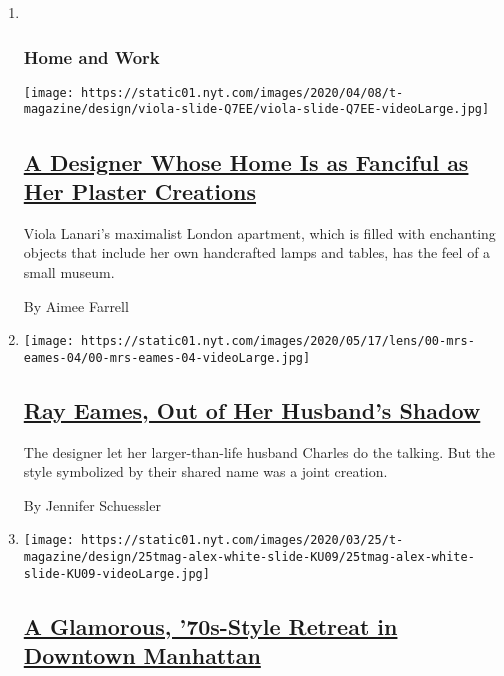 \begin{enumerate}
\def\labelenumi{\arabic{enumi}.}
\item ~
  \hypertarget{home-and-work}{%
  \subsubsection{Home and Work}\label{home-and-work}}

  \texttt{[image: https://static01.nyt.com/images/2020/04/08/t-magazine/design/viola-slide-Q7EE/viola-slide-Q7EE-videoLarge.jpg]}

  \hypertarget{a-designer-whose-home-is-as-fanciful-as-her-plaster-creations}{%
  \subsection{\texorpdfstring{\href{/2020/04/09/t-magazine/viola-lanari.html}{A
  Designer Whose Home Is as Fanciful as Her Plaster
  Creations}}{A Designer Whose Home Is as Fanciful as Her Plaster Creations}}\label{a-designer-whose-home-is-as-fanciful-as-her-plaster-creations}}

  Viola Lanari's maximalist London apartment, which is filled with
  enchanting objects that include her own handcrafted lamps and tables,
  has the feel of a small museum.

  By Aimee Farrell
\item
  \texttt{[image: https://static01.nyt.com/images/2020/05/17/lens/00-mrs-eames-04/00-mrs-eames-04-videoLarge.jpg]}

  \hypertarget{ray-eames-out-of-her-husbands-shadow}{%
  \subsection{\texorpdfstring{\href{/2020/05/15/arts/ray-charles-eames-artists.html}{Ray
  Eames, Out of Her Husband's
  Shadow}}{Ray Eames, Out of Her Husband's Shadow}}\label{ray-eames-out-of-her-husbands-shadow}}

  The designer let her larger-than-life husband Charles do the talking.
  But the style symbolized by their shared name was a joint creation.

  By Jennifer Schuessler
\item
  \texttt{[image: https://static01.nyt.com/images/2020/03/25/t-magazine/design/25tmag-alex-white-slide-KU09/25tmag-alex-white-slide-KU09-videoLarge.jpg]}

  \hypertarget{a-glamorous-70s-style-retreat-in-downtown-manhattan}{%
  \subsection{\texorpdfstring{\href{/2020/03/26/t-magazine/downtown-manhattan-apartment-alex-p-white.html}{A
  Glamorous, '70s-Style Retreat in Downtown
  Manhattan}}{A Glamorous, '70s-Style Retreat in Downtown Manhattan}}\label{a-glamorous-70s-style-retreat-in-downtown-manhattan}}


\end{enumerate}
